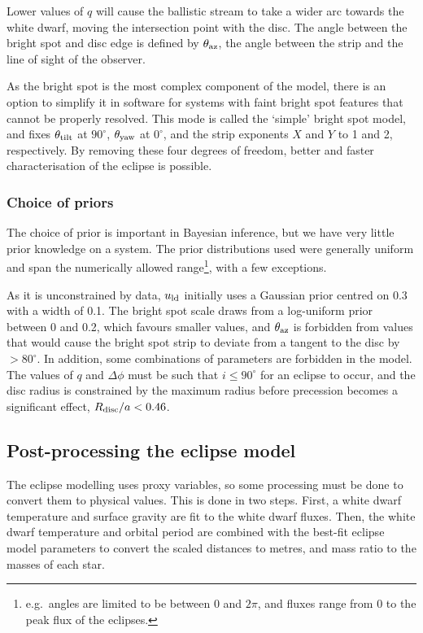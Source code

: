 Lower values of $q$ will cause the ballistic stream to take a wider arc towards the white dwarf, moving the intersection point with the disc. The angle between the bright spot and disc edge is defined by $\theta_{\rm az}$, the angle between the strip and the line of sight of the observer.

As the bright spot is the most complex component of the model, there is an option to simplify it in software for systems with faint bright spot features that cannot be properly resolved.
This mode is called the `simple' bright spot model, and fixes $\theta_{\rm tilt}$ at $90^\circ$, $\theta_{\rm yaw}$ at $0^\circ$, and the strip exponents $X$ and $Y$ to 1 and 2, respectively. By removing these four degrees of freedom, better and faster characterisation of the eclipse is possible.

\subsubsection{Choice of priors}

The choice of prior is important in Bayesian inference, but we have very little prior knowledge on a system. The prior distributions used were generally uniform and span the numerically allowed range\footnote{e.g.\ angles are limited to be between 0 and $2\pi$, and fluxes range from 0 to the peak flux of the eclipses.}, with a few exceptions.

As it is unconstrained by data, $u_{\rm ld}$ initially uses a Gaussian prior centred on 0.3 with a width of 0.1.
The bright spot scale draws from a log-uniform prior between 0 and 0.2, which favours smaller values, and $\theta_{\rm az}$ is forbidden from values that would cause the bright spot strip to deviate from a tangent to the disc by $>80^\circ$.
In addition, some combinations of parameters are forbidden in the model. The values of $q$ and $\Delta\phi$ must be such that $i \leq 90^\circ$ for an eclipse to occur, and the disc radius is constrained by the maximum radius before precession becomes a significant effect, $R_{\rm disc} / a < 0.46$.


\subsection{Post-processing the eclipse model}
\label{sect:modelling:post processing the eclipse model}

The eclipse modelling uses proxy variables, so some processing must be done to convert them to physical values. This is done in two steps. First, a white dwarf temperature and surface gravity are fit to the white dwarf fluxes. Then, the white dwarf temperature and orbital period are combined with the best-fit eclipse model parameters to convert the scaled distances to metres, and mass ratio to the masses of each star.

